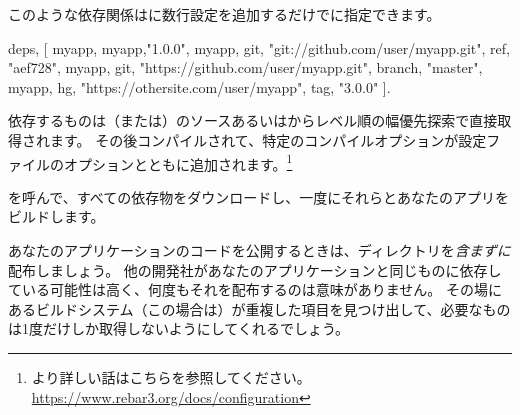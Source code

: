 このような依存関係はに数行設定を追加するだけでに指定できます。

\begin{VerbatimText}
{deps, [
  myapp,
  {myapp,"1.0.0"},
  {myapp, {git, "git://github.com/user/myapp.git", {ref, "aef728"}}},
  {myapp, {git, "https://github.com/user/myapp.git", {branch, "master"}}},
  {myapp, {hg, "https://othersite.com/user/myapp", {tag, "3.0.0"}}}
 ]}.
\end{VerbatimText}

依存するものは（または）のソースあるいは\href{https://hex.pm}{}からレベル順の幅優先探索で直接取得されます。
その後コンパイルされて、特定のコンパイルオプションが設定ファイルのオプションとともに追加されます。\footnote{より詳しい話はこちらを参照してください。\href{https://www.rebar3.org/docs/configuration}{https://www.rebar3.org/docs/configuration}}

を呼んで、すべての依存物をダウンロードし、一度にそれらとあなたのアプリをビルドします。

あなたのアプリケーションのコードを公開するときは、ディレクトリを\emph{含まずに}配布しましょう。
他の開発社があなたのアプリケーションと同じものに依存している可能性は高く、何度もそれを配布するのは意味がありません。
その場にあるビルドシステム（この場合は）が重複した項目を見つけ出して、必要なものは1度だけしか取得しないようにしてくれるでしょう。

